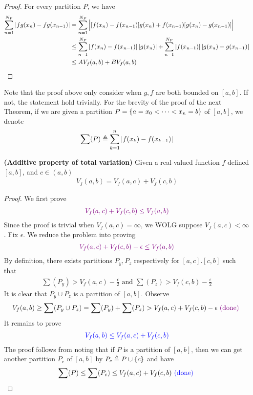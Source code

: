 \documentclass{report}
\begin{document}
\begin{proof}
For every partition $P$, we have 
 \begin{align*}
   \sum_{n=1}^{N_P} \left|fg(x_n)-fg(x_{n-1})\right|&= \sum_{n=1}^{N_P} \Big| [f(x_n)-f(x_{n-1})]g(x_n)+f(x_{n-1})[g(x_n)-g(x_{n-1})]\Big|\\
&\leq \sum_{n=1}^{N_P} \left|f(x_n)-f(x_{n-1})\right|\left|g(x_n)\right|+ \sum_{n=1}^{N_P} \left|f(x_{n-1})\right| \left|g(x_n)-g(x_{n-1})\right|\\
&\leq AV_f(a,b)+ BV_f(a,b)
\end{align*}
\end{proof}
\begin{mdframed}
Note that the proof above only consider when $g,f$ are both bounded on  $[a,b]$. If not, the statement hold trivially. For the brevity of the proof of the next Theorem,  if we are given a partition $P=\{ a=x_0< \cdots <x_n=b \}$ of $[a,b]$, we denote
\begin{align*}
\sum  (P)\triangleq \sum_{k=1}^n\left|f(x_k)-f(x_{k-1})\right|
\end{align*}
\end{mdframed}
\begin{theorem}
\label{Apotv}
\textbf{(Additive property of total variation)} Given a real-valued function $f$  defined $[a,b]$, and $c \in (a,b)$  
\begin{align*}
V_f(a,b)=V_f(a,c)+V_f(c,b)
\end{align*}
\end{theorem}
\begin{proof}
We first prove 
\begin{align*}
\textcolor{violet}{V_f(a,c)+V_f(c,b)\leq V_f(a,b)}
\end{align*}
Since the proof is trivial when $V_f(a,c)=\infty$, we WOLG suppose $V_f(a,c)<\infty$. Fix $\epsilon $. We reduce the problem into proving 
\begin{align*}
  \textcolor{violet}{V_f(a,c)+V_f(c,b)-\epsilon  \leq V_f(a,b)}
\end{align*}
By definition, there exists partitions $P_y,P_z$ respectively for $[a,c].[c,b]$ such that 
\begin{align*}
\sum (P_y) > V_f(a,c)- \frac{\epsilon }{2} \text{ and } \sum (P_z)> V_f(c,b)- \frac{\epsilon}{2}
\end{align*}
It is clear that $P_y\cup P_z$  is a partition of $[a,b]$. Observe
\begin{align*}
  V_f(a,b)\geq \sum (P_y \cup P_z) = \sum (P_y) + \sum (P_z) > V_f(a,c) + V_f(c,b)- \epsilon \textcolor{violet}{\text{ (done) }}
\end{align*}
It remains to prove
\begin{align*}
  \textcolor{blue}{V_f(a,b)\leq V_f(a,c)+ V_f(c,b)}
\end{align*}
The proof follows from noting that if $P$ is a partition of  $[a,b]$, then we can get another partition $P_c$ of  $[a,b]$ by $P_c \triangleq  P \cup \{ c \}$ and have 
\begin{align*}
\sum (P) \leq \sum (P_c) \leq V_f(a,c) + V_f(c,b) \textcolor{blue}{\text{ (done) }}
\end{align*}
\end{proof}
\end{document}
